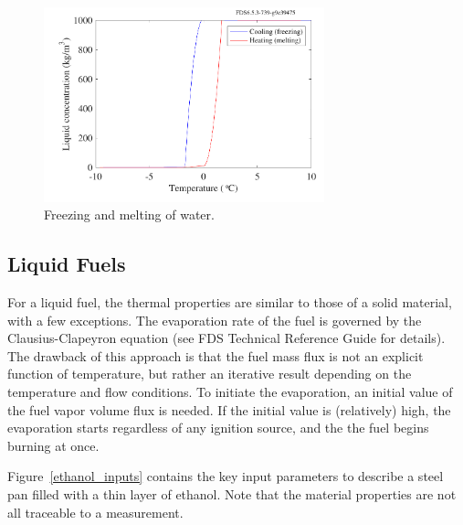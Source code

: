 \documentclass[11pt]{book}
\begin{document}
\begin{figure}[ht]
\begin{center}
\includegraphics[width=3.2in]{SCRIPT_FIGURES/water_ice_water}
\end{center}
\caption[Freezing and melting of water]{Freezing and melting of water.}
\label{water_ice_water_plot}
\end{figure}









\clearpage


\subsection{Liquid Fuels}

\label{info:liquid_fuels}

For a liquid fuel, the thermal properties are similar to those of a solid
material, with a few exceptions. The evaporation rate of the fuel
is governed by the Clausius-Clapeyron equation (see FDS Technical Reference
Guide for details). The drawback of this approach is that the fuel
mass flux is not an explicit function of temperature, but rather an
iterative result depending on the temperature and flow conditions. To
initiate the evaporation, an initial value of the fuel vapor volume
flux is needed. If the initial value is (relatively) high, the evaporation
starts regardless of any ignition source, and the the fuel begins
burning at once.

Figure~\ref{ethanol_inputs} contains the key input parameters to describe a steel pan filled with a thin layer of ethanol. Note that the material
properties are not all traceable to a measurement.
\end{document}
